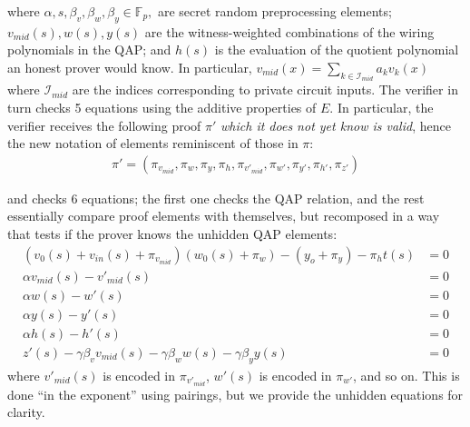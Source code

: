 where $\alpha, s, \beta_v, \beta_w, \beta_y \in \mathbb{F}_p, $ are secret random preprocessing elements; $v_{mid}(s), w(s), y(s)$ are the witness-weighted combinations of the wiring polynomials in the QAP; and $h(s)$ is the evaluation of the quotient polynomial an honest prover would know. In particular, $v_{mid}(x) = \sum_{k \in \mathcal{I}_{mid}} a_k v_k(x)$ where $\mathcal{I}_{mid}$ are the indices corresponding to private circuit inputs. The verifier in turn checks 5 equations using the additive properties of $E$. In particular, the verifier receives the following proof $\pi'$ \textit{which it does not yet know is valid}, hence the new notation of elements reminiscent of those in $\pi$:
\begin{align}
\pi' = (\pi_{v_{mid}}, \pi_{w}, \pi_{y}, \pi_{h}, \pi_{v'_{mid}}, \pi_{w'}, \pi_{y'}, \pi_{h'}, \pi_{z'})
\end{align}

and checks 6 equations; the first one checks the QAP relation, and the rest essentially compare proof elements with themselves, but recomposed in a way that tests if the prover knows the unhidden QAP elements:
\begin{align}
(v_0(s) + v_{in}(s) + \pi_{v_{mid}})(w_0(s) + \pi_w) - (y_o + \pi_{y}) - \pi_h t(s) &= 0 \\
\alpha v_{mid}(s) - v'_{mid}(s) &= 0 \\
\alpha w(s) - w'(s) &= 0 \\
\alpha y(s) - y'(s) &= 0 \\
\alpha h(s) - h'(s) &= 0 \\
z'(s) - \gamma \beta_v v_{mid}(s) - \gamma \beta_w w(s) - \gamma \beta_y y(s) &= 0
\end{align}
where $v'_{mid}(s)$ is encoded in $\pi_{v'_{mid}}$, $w'(s)$ is encoded in $\pi_{w'}$, and so on. This is done ``in the exponent'' using pairings, but we provide the unhidden equations for clarity.\\

